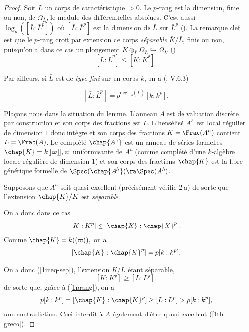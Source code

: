 \documentclass[10pt]{../fichiers-configuration-latex/smfart}
\begin{document}
\begin{proof}

Soit ${\bar L}$ un corps de caractéristique $>0$. Le $p$-rang est la dimension, finie ou non, de
$\Omega_{\bar L}$, le module des différentielles absolues. C'est aussi $\log_p([{\bar L}:{\bar
L}^p])$ où $[{\bar L}:{\bar L}^p]$ est la dimension de ${\bar L}$ sur ${\bar L}^p$
().  La remarque clef est que le $p$-rang croit par extension de corps
\emph{séparable} ${\bar K}/{\bar L}$,  finie ou non, puisqu'on a dans ce cas un plongement ${\bar
K}\otimes_{\bar L}\Omega_{\bar L}\hookrightarrow \Omega_{{\bar K}}$ ()
\begin{equation}\label{1ineq-sep} [{\bar L}:{\bar L}^p]\leq [{\bar K}:{\bar K}^p].  \end{equation}

Par ailleurs, si ${\bar L}$ est de \emph{type fini} sur un corps $k$, on a (\cite{Bou50}, V.6.3)

\begin{equation}\label{1prang} [{\bar L}:{\bar L}^p]=p^{\text{degtr}_k({\bar L})}[k:k^p].
\end{equation}


Plaçons nous dans la situation du lemme. L'anneau $A$ est de valuation discrète par construction et
son corps des fractions est $L$. L'hensélisé $A^h$ est local régulier de dimension $1$ donc intègre
et son corps des fractions $K=\Frac(A^h)$ contient $L=\Frac(A)$.  Le  complété $\chap{A^h}$ est un
anneau de séries formelles $\chap{K}=k[[\varpi]],\varpi $ uniformisante de $A^h$ (comme complété
d'une $k$-algèbre locale régulière de dimension $1$) et son corps des fractions  $\chap{K}$ est la
fibre générique formelle de $\Spec(\chap{A^h})\ra\Spec(A^h)$.

Supposons que $A^h$ soit quasi-excellent (précisément vérifie 2.a) de sorte que l'extension
$\chap{K}/K$ est \emph{séparable}.


On a donc dans ce cas $$[K:K^p]\leq[\chap{K}:\chap{K}^p].$$ Comme $\chap{K}=k((\varpi)),$ on a
$$[\chap{K}:\chap{K}^p]=p[k:k^p].$$

On a donc (\ref{1ineq-sep}), l'extension $K/L$ étant séparable, $$[K:K^p]\geq [L:L^p].$$ de sorte
que, grâce à (\ref{1prang}), on a $$p[k:k^p]=[\chap{K}:\chap{K}^p]\geq [L:L^p]>p[k:k^p],$$ une
contradiction. Ceci interdit à $A$ également d'être quasi-excellent (\ref{1th-greco}).\end{proof}

\ifx\danslelivre\undefined


\end{document}

